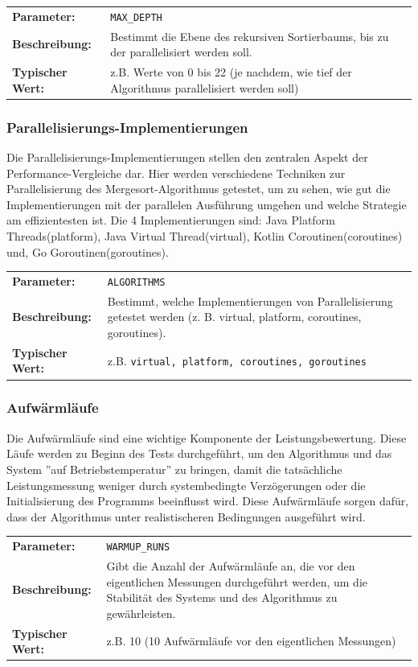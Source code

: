 \documentclass[fontsize=12pt,paper=a4,twoside=semi,parskip=half-,headsepline,headinclude]{scrreprt}
\begin{document}
\begin{tabularx}{\textwidth}{@{}lX@{}}
	\textbf{Parameter:}    & \texttt{MAX\_DEPTH} \\
	\textbf{Beschreibung:} & Bestimmt die Ebene des rekursiven Sortierbaums, 
	bis zu der parallelisiert werden soll. \\
	\textbf{Typischer Wert:} & z.B. Werte von 0 bis 22 (je nachdem, wie tief der Algorithmus parallelisiert werden soll)
\end{tabularx}

\subsubsection{Parallelisierungs-Implementierungen}

Die Parallelisierungs-Implementierungen stellen den zentralen Aspekt der Performance-Ver\-glei\-che dar. Hier werden verschiedene Techniken zur Parallelisierung des Mergesort-Al\-go\-rith\-mus getestet, um zu sehen, wie gut die Implementierungen mit der parallelen Ausführung umgehen und welche Strategie am effizientesten ist. Die 4 Implementierungen sind: Java Platform Threads(platform), Java Virtual Thread(virtual), Kotlin Coroutinen(coroutines) und, Go Goroutinen(goroutines).

\begin{tabularx}{\textwidth}{@{}lX@{}}
	\textbf{Parameter:}    & \texttt{ALGORITHMS} \\
	\textbf{Beschreibung:} & Bestimmt, welche Implementierungen von Parallelisierung getestet werden (z. B. virtual, platform, coroutines, goroutines). \\
	\textbf{Typischer Wert:} & z.B. \texttt{virtual, platform, coroutines, goroutines}
\end{tabularx}

\subsubsection{Aufwärmläufe}

Die Aufwärmläufe sind eine wichtige Komponente der Leistungsbewertung. Diese Läufe werden zu Beginn des Tests durchgeführt, um den Algorithmus und das System ''auf Betriebstemperatur'' zu bringen, damit die tatsächliche Leistungsmessung weniger durch systembedingte Verzögerungen oder die Initialisierung des Programms beeinflusst wird. Diese Aufwärmläufe sorgen dafür, dass der Algorithmus unter realistischeren Bedingungen ausgeführt wird.

\begin{tabularx}{\textwidth}{@{}lX@{}}
	\textbf{Parameter:}    & \texttt{WARMUP\_RUNS} \\
	\textbf{Beschreibung:} & Gibt die Anzahl der Aufwärmläufe an, die vor den eigentlichen Messungen durchgeführt werden, um die Stabilität des Systems und des Algorithmus zu gewährleisten. \\
	\textbf{Typischer Wert:} & z.B. 10 (10 Aufwärmläufe vor den eigentlichen Messungen)
\end{tabularx}
\end{document}
